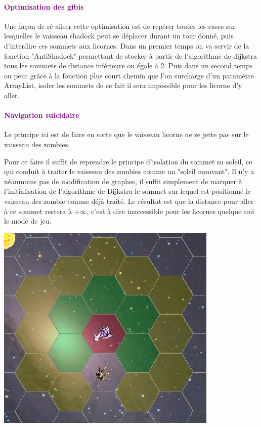 \documentclass{report}
\begin{document}
			\paragraph{\textcolor{purple}{Optimisation des gibis}}
			Une façon de ré aliser cette optimisation est de rep\'erer toutes les cases sur lesquelles le vaisseau shadock peut se d\'eplacer durant un tour donn\'e, puis d'interdire ces sommets aux licornes.
			Dans un premier temps on va servir de la fonction "AntiShadock" permettant de stocker à partir de l'algorithme de dijkstra tous les sommets de distance inf\'erieure ou \'egale \`a 2.
			Puis dans un second temps on peut grâce à la fonction plus court chemin que l'on surcharge d'un paramètre ArrayList, isoler les sommets de ce fait il sera impossible pour les licorne d'y aller.
			\paragraph{\textcolor{purple}{Navigation suicidaire}}
			Le principe ici est de faire en sorte que le vaisseau licorne ne se jette pas sur le vaisseau des zombies.
			
			Pour ce faire il suffit de reprendre le principe d'isolation du sommet su soleil, ce qui conduit à traiter le vaisseau des zombies comme un "soleil mouvant". Il n'y a néanmoins pas de modification de graphes, il suffit simplement de marquer à l'initialisation de l'algorithme de Dijkstra le sommet sur lequel est positionné le vaisseau des zombie comme déjà traité. Le résultat est que la distance pour aller à ce sommet restera à $+\infty$, c'est à dire inaccessible pour les licornes quelque soit le mode de jeu.
			\begin{center}  
          \includegraphics[scale=0.30]{Images/isoleZombie.png}
      		\end{center} 
      		
\end{document}
